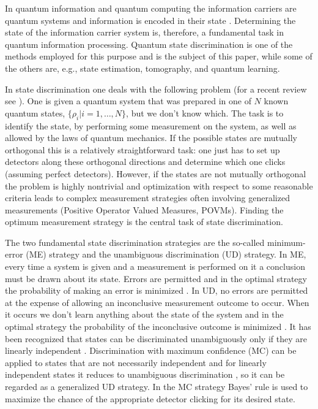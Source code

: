 \documentclass[aps,pra,twocolumn,eqsecnum,showpacs]{revtex4}
\begin{document}
In quantum information and quantum computing the information carriers are quantum systems and information is encoded in their state \cite{nielsen1}. Determining the state of the information carrier system is, therefore, a fundamental task in quantum information processing. Quantum state discrimination is one of the methods employed for this purpose and is the subject of this paper, while some of the others are, e.g., state estimation, tomography, and quantum learning.  

In state discrimination one deals with the following problem (for a recent review see \cite{bergourev}). One is given a quantum system that was prepared in one of $N$ known quantum states, $\{\rho_{i}|i=1,\ldots,N\}$, but we don't know which. The task is to identify the state, by performing some measurement on the system, as well as allowed by the laws of quantum mechanics. If the possible states are mutually orthogonal this is a relatively straightforward task: one just has to set up detectors along these orthogonal directions and determine which one clicks (assuming perfect detectors). However, if the states are not mutually orthogonal the problem is highly nontrivial and optimization with respect to some reasonable criteria leads to complex measurement strategies often involving generalized measurements (Positive Operator Valued Measures, POVMs).  Finding the optimum measurement strategy is the central task of state discrimination. 

The two fundamental state discrimination strategies are the so-called minimum-error (ME) strategy and the unambiguous discrimination (UD) strategy. In ME, every time a system is given and a measurement is performed on it a conclusion must be drawn about its state. Errors are permitted and in the optimal strategy the probability of making an error is minimized \cite{helstrom}. In UD, no errors are permitted at the expense of allowing an inconclusive measurement outcome to occur. When it occurs we don't learn anything about the state of the system and in the optimal strategy the probability of the inconclusive outcome is minimized \cite{ivanovic,dieks,peres,jaeger}. It has been recognized that states can be discriminated unambiguously only if they are linearly independent \cite{chefles1}. Discrimination with maximum confidence (MC) can be applied to states that are not necessarily independent and for linearly independent states it reduces to unambiguous discrimination \cite{croke,herzog1}, so it can be regarded as a generalized UD strategy. In the MC strategy Bayes' rule is used to maximize the chance of the appropriate detector clicking for its desired state.
\end{document}
